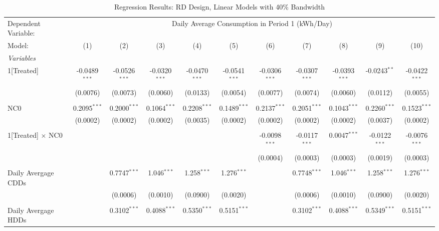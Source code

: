 \begin{table}[htbp]
\centering
\caption{\label{Table:Regression-Results_RD_Linear_BW-40} Regression Results: RD Design, Linear Models with 40\% Bandwidth}
\begin{adjustbox}{scale = 0.7}
\begin{tabular}{lcccccccccc}
\tabularnewline\toprule\toprule
Dependent Variable:&\multicolumn{10}{c}{Daily Average Consumption in Period 1 (kWh/Day)}\\
Model:&(1) & (2) & (3) & (4) & (5) & (6) & (7) & (8) & (9) & (10)\\
\midrule
\emph{Variables}&   &   &   &   &   &   &   &   &   &  \\
1[Treated]&-0.0489$^{***}$ & -0.0526$^{***}$ & -0.0320$^{***}$ & -0.0470$^{***}$ & -0.0541$^{***}$ & -0.0306$^{***}$ & -0.0307$^{***}$ & -0.0393$^{***}$ & -0.0243$^{**}$ & -0.0422$^{***}$\\
  &(0.0076) & (0.0073) & (0.0060) & (0.0133) & (0.0054) & (0.0077) & (0.0074) & (0.0060) & (0.0112) & (0.0055)\\
&   &   &   &   &   &   &   &   &   &  \\
NC0&0.2095$^{***}$ & 0.2000$^{***}$ & 0.1064$^{***}$ & 0.2208$^{***}$ & 0.1489$^{***}$ & 0.2137$^{***}$ & 0.2051$^{***}$ & 0.1043$^{***}$ & 0.2260$^{***}$ & 0.1523$^{***}$\\
  &(0.0002) & (0.0002) & (0.0002) & (0.0035) & (0.0002) & (0.0002) & (0.0002) & (0.0002) & (0.0037) & (0.0002)\\
&   &   &   &   &   &   &   &   &   &  \\
1[Treated] $\times $ NC0&   &    &    &    &    & -0.0098$^{***}$ & -0.0117$^{***}$ & 0.0047$^{***}$ & -0.0122$^{***}$ & -0.0076$^{***}$\\
  &   &    &    &    &    & (0.0004) & (0.0003) & (0.0003) & (0.0019) & (0.0003)\\
&   &   &   &   &   &   &   &   &   &  \\
Daily Avergage CDDs&   & 0.7747$^{***}$ & 1.046$^{***}$ & 1.258$^{***}$ & 1.276$^{***}$ &    & 0.7748$^{***}$ & 1.046$^{***}$ & 1.258$^{***}$ & 1.276$^{***}$\\
  &   & (0.0006) & (0.0010) & (0.0900) & (0.0020) &    & (0.0006) & (0.0010) & (0.0900) & (0.0020)\\
&   &   &   &   &   &   &   &   &   &  \\
Daily Avergage HDDs&   & 0.3102$^{***}$ & 0.4088$^{***}$ & 0.5350$^{***}$ & 0.5151$^{***}$ &    & 0.3102$^{***}$ & 0.4088$^{***}$ & 0.5349$^{***}$ & 0.5151$^{***}$\\

\end{tabular}
\end{adjustbox}
\end{table}
